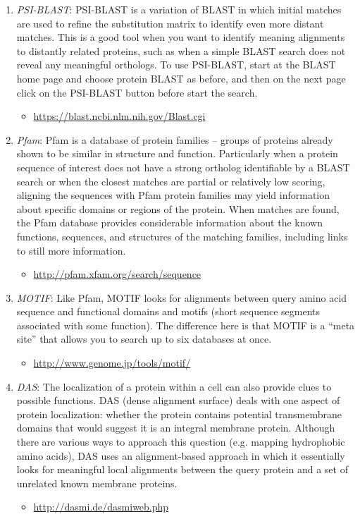 \begin{enumerate}
	\item \emph{PSI-BLAST}: PSI-BLAST is a variation of BLAST in which initial matches are used to refine the substitution matrix to identify even more distant matches. This is a good tool when you want to identify meaning alignments to distantly related proteins, such as when a simple BLAST search does not reveal any meaningful orthologs. To use PSI-BLAST, start at the BLAST home page and choose protein BLAST as before, and then on the next page click on the PSI-BLAST button before start the search.
	\begin{itemize}
	 \item \url{https://blast.ncbi.nlm.nih.gov/Blast.cgi}
	\end{itemize}


	\item \emph{Pfam}: Pfam is a database of protein families – groups of proteins already shown to be similar in structure and function.  Particularly when a protein sequence of interest does not have a strong ortholog identifiable by a BLAST search or when the closest matches are partial or relatively low scoring, aligning the sequences with Pfam protein families may yield information about specific domains or regions of the protein.  When matches are found, the Pfam database provides considerable information about the known functions, sequences, and structures of the matching families, including links to still more information.
	\begin{itemize}
	  \item \url{http://pfam.xfam.org/search/sequence}
	\end{itemize}

	
	\item \emph{MOTIF}: Like Pfam, MOTIF looks for alignments between query amino acid sequence and functional domains and motifs (short sequence segments associated with some function).  The difference here is that MOTIF is a “meta site” that allows you to search up to six databases at once.
	\begin{itemize}
	 \item \url{http://www.genome.jp/tools/motif/}
	\end{itemize}

	
	\item \emph{DAS}: The localization of a protein within a cell can also provide clues to possible functions.  DAS (dense alignment surface) deals with one aspect of protein localization: whether the protein contains potential transmembrane domains that would suggest it is an integral membrane protein.  Although there are various ways to approach this question (e.g. mapping hydrophobic amino acids), DAS uses an alignment-based approach in which it essentially looks for meaningful local alignments between the query protein and a set of unrelated known membrane proteins. 
	\begin{itemize}
	  \item \url{http://dasmi.de/dasmiweb.php}
	\end{itemize}

\end{enumerate}


